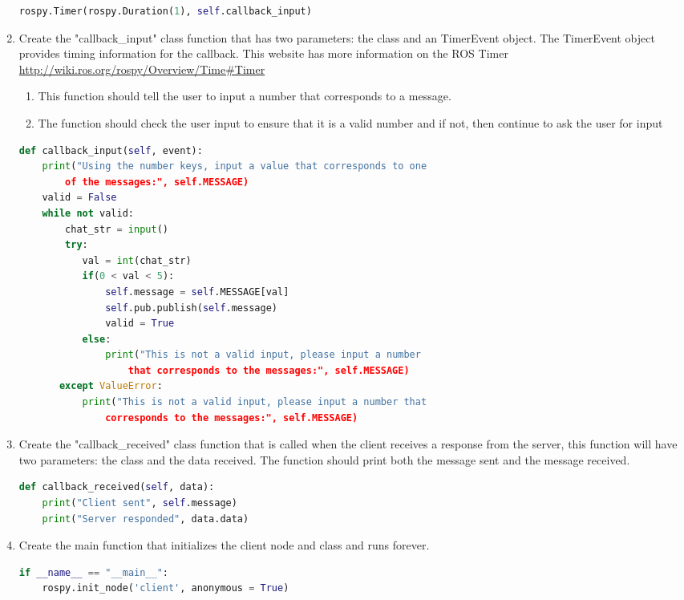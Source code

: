 \documentclass{handout}
\begin{document}
\begin{enumerate}
\begin{lstlisting}[language=python]
rospy.Timer(rospy.Duration(1), self.callback_input)
\end{lstlisting}
	\item Create the "callback\_input" class function that has two parameters: the class and an TimerEvent object. The TimerEvent object provides timing information for the callback. This website has more information on the ROS Timer \url{http://wiki.ros.org/rospy/Overview/Time#Timer}
	\begin{enumerate}
		\item This function should tell the user to input a number that corresponds to a message.
		\item The function should check the user input to ensure that it is a valid number and if not, then continue to ask the user for input
	\end{enumerate}
\begin{lstlisting}[language=python]
def callback_input(self, event):
    print("Using the number keys, input a value that corresponds to one 
        of the messages:", self.MESSAGE)
    valid = False
    while not valid:
        chat_str = input()
        try:
           val = int(chat_str)
           if(0 < val < 5):
               self.message = self.MESSAGE[val]
               self.pub.publish(self.message)
               valid = True
           else:
               print("This is not a valid input, please input a number
                   that corresponds to the messages:", self.MESSAGE)
       except ValueError:
           print("This is not a valid input, please input a number that 
               corresponds to the messages:", self.MESSAGE)
\end{lstlisting}

	\item Create the "callback\_received" class function that is called when the client receives a response from the server, this function will have two parameters: the class and the data received. The function should print both the message sent and the message received.
	
\begin{lstlisting}[language=python]
def callback_received(self, data):
    print("Client sent", self.message)
    print("Server responded", data.data)
\end{lstlisting}

	\item Create the main function that initializes the client node and class and runs forever.
\begin{lstlisting}[language=python]
if __name__ == "__main__":
    rospy.init_node('client', anonymous = True)
    

\end{lstlisting}
\end{enumerate}
\end{document}
